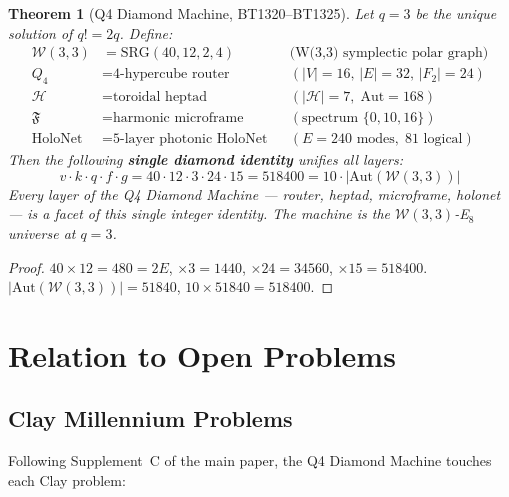 \documentclass[12pt,a4paper]{article}
\newtheorem{theorem}{Theorem}[section]
\newcommand{\W}{\mathcal{W}(3,3)}
\newcommand{\Hol}{\mathrm{HoloNet}}
\begin{document}
\begin{theorem}[Q4 Diamond Machine, BT1320--BT1325]
Let $q=3$ be the unique solution of $q!=2q$. Define:
\begin{align*}
  \W &= \mathrm{SRG}(40,12,2,4) & &\text{(W(3,3) symplectic polar graph)}\\
  Q_4 &= \text{4-hypercube router} & &(|V|=16,\,|E|=32,\,|F_2|=24)\\
  \mathcal{H} &= \text{toroidal heptad} & &(|\mathcal{H}|=7,\;\mathrm{Aut}=168)\\
  \mathfrak{F} &= \text{harmonic microframe} & &(\text{spectrum }\{0,10,16\})\\
  \Hol &= \text{5-layer photonic HoloNet} & &(E=240\text{ modes},\;81\text{ logical})
\end{align*}
Then the following \textbf{single diamond identity} unifies all layers:
\[
  \boxed{
    v\cdot k\cdot q\cdot f\cdot g
    = 40\cdot 12\cdot 3\cdot 24\cdot 15
    = 518400
    = 10\cdot|\mathrm{Aut}(\W)|
  }
\]
Every layer of the Q4 Diamond Machine --- router, heptad, microframe,
holonet --- is a facet of this single integer identity. The machine
\emph{is} the $\W$-E$_8$ universe at $q=3$.
\end{theorem}

\begin{proof}
  $40\times 12=480=2E$, $\times 3=1440$, $\times 24=34560$, $\times 15=518400$.
  $|\mathrm{Aut}(\W)|=51840$, $10\times 51840=518400$.\checkmark
\end{proof}

\section{Relation to Open Problems}

\subsection{Clay Millennium Problems}

Following Supplement~C of the main paper, the Q4 Diamond Machine touches
each Clay problem:
\end{document}
